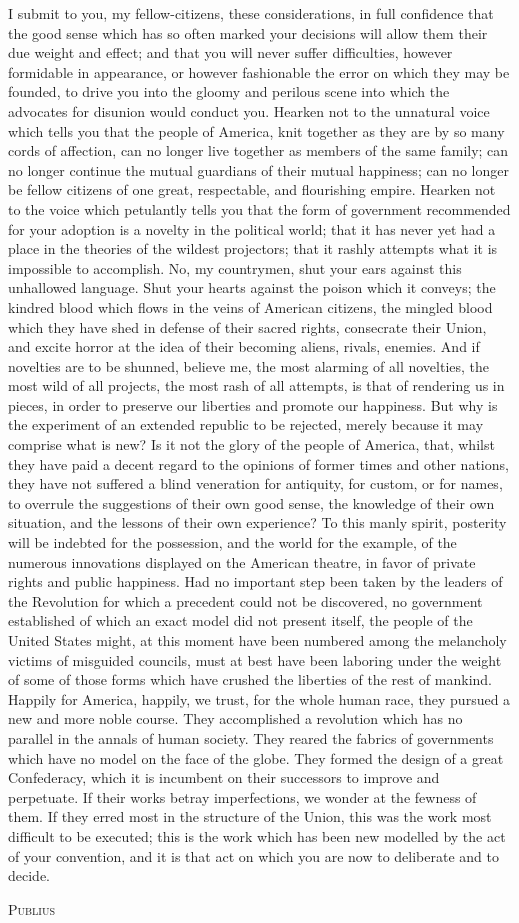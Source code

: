 I submit to you, my fellow-citizens, these considerations, in full confidence that the good sense which has so often marked your decisions will allow them their due weight and effect; and that you will never suffer difficulties, however formidable in appearance, or however fashionable the error on which they may be founded, to drive you into the gloomy and perilous scene into which the advocates for disunion would conduct you. Hearken not to the unnatural voice which tells you that the people of America, knit together as they are by so many cords of affection, can no longer live together as members of the same family; can no longer continue the mutual guardians of their mutual happiness; can no longer be fellow citizens of one great, respectable, and flourishing empire. Hearken not to the voice which petulantly tells you that the form of government recommended for your adoption is a novelty in the political world; that it has never yet had a place in the theories of the wildest projectors; that it rashly attempts what it is impossible to accomplish. No, my countrymen, shut your ears against this unhallowed language. Shut your hearts against the poison which it conveys; the kindred blood which flows in the veins of American citizens, the mingled blood which they have shed in defense of their sacred rights, consecrate their Union, and excite horror at the idea of their becoming aliens, rivals, enemies. And if novelties are to be shunned, believe me, the most alarming of all novelties, the most wild of all projects, the most rash of all attempts, is that of rendering us in pieces, in order to preserve our liberties and promote our happiness. But why is the experiment of an extended republic to be rejected, merely because it may comprise what is new? Is it not the glory of the people of America, that, whilst they have paid a decent regard to the opinions of former times and other nations, they have not suffered a blind veneration for antiquity, for custom, or for names, to overrule the suggestions of their own good sense, the knowledge of their own situation, and the lessons of their own experience? To this manly spirit, posterity will be indebted for the possession, and the world for the example, of the numerous innovations displayed on the American theatre, in favor of private rights and public happiness. Had no important step been taken by the leaders of the Revolution for which a precedent could not be discovered, no government established of which an exact model did not present itself, the people of the United States might, at this moment have been numbered among the melancholy victims of misguided councils, must at best have been laboring under the weight of some of those forms which have crushed the liberties of the rest of mankind. Happily for America, happily, we trust, for the whole human race, they pursued a new and more noble course. They accomplished a revolution which has no parallel in the annals of human society. They reared the fabrics of governments which have no model on the face of the globe. They formed the design of a great Confederacy, which it is incumbent on their successors to improve and perpetuate. If their works betray imperfections, we wonder at the fewness of them. If they erred most in the structure of the Union, this was the work most difficult to be executed; this is the work which has been new modelled by the act of your convention, and it is that act on which you are now to deliberate and to decide.

\vspace{.5cm}
\textsc{Publius}
